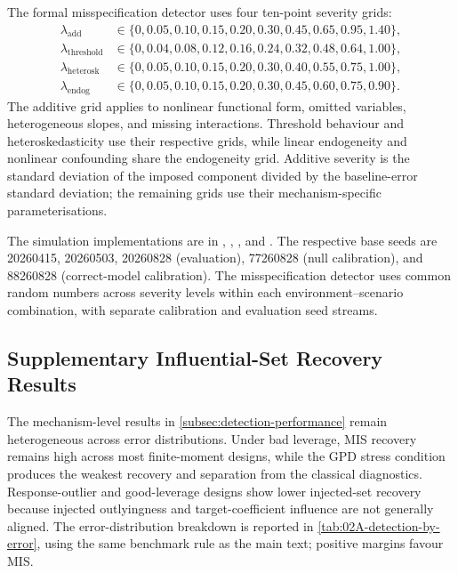 \documentclass[../main.tex]{subfiles}
\begin{document}
The formal misspecification detector uses four ten-point severity grids:
\[
\begin{aligned}
	\lambda_{\mathrm{add}}
	&\in \{0,0.05,0.10,0.15,0.20,0.30,0.45,0.65,0.95,1.40\},\\
	\lambda_{\mathrm{threshold}}
	&\in \{0,0.04,0.08,0.12,0.16,0.24,0.32,0.48,0.64,1.00\},\\
	\lambda_{\mathrm{heterosk}}
	&\in \{0,0.05,0.10,0.15,0.20,0.30,0.40,0.55,0.75,1.00\},\\
	\lambda_{\mathrm{endog}}
	&\in \{0,0.05,0.10,0.15,0.20,0.30,0.45,0.60,0.75,0.90\}.
\end{aligned}
\]
The additive grid applies to nonlinear functional form, omitted variables, heterogeneous slopes, and missing interactions. Threshold behaviour and heteroskedasticity use their respective grids, while linear endogeneity and nonlinear confounding share the endogeneity grid. Additive severity is the standard deviation of the imposed component divided by the baseline-error standard deviation; the remaining grids use their mechanism-specific parameterisations.


The simulation implementations are in
,
,
, and
.
The respective base seeds are 20260415, 20260503, 20260828
(evaluation), 77260828 (null calibration), and 88260828
(correct-model calibration). The misspecification detector uses
common random numbers across severity levels within each
environment--scenario combination, with separate calibration
and evaluation seed streams.



\FloatBarrier
\subsection{Supplementary Influential-Set Recovery Results}
\label{app:detection-results}

The mechanism-level results in \autoref{subsec:detection-performance} remain heterogeneous across error distributions. Under bad leverage, MIS recovery remains high across most finite-moment designs, while the GPD stress condition produces the weakest recovery and separation from the classical diagnostics. Response-outlier and good-leverage designs show lower injected-set recovery because injected outlyingness and target-coefficient influence are not generally aligned. The error-distribution breakdown is reported in \autoref{tab:02A-detection-by-error}, using the same benchmark rule as the main text; positive margins favour MIS.
\end{document}

